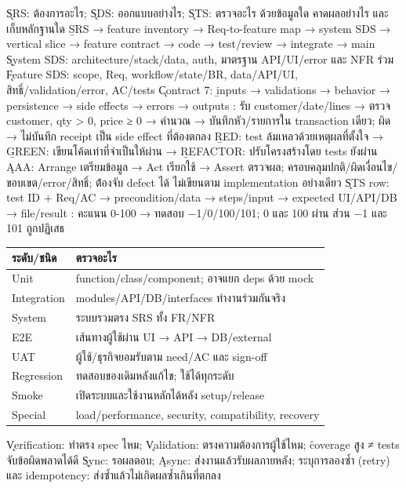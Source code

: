 \k{SRS}: ต้องการอะไร; \k{SDS}: ออกแบบอย่างไร; \k{STS}: ตรวจอะไร ด้วยข้อมูลใด คาดผลอย่างไร และเก็บหลักฐานใด
\b{SRS → feature inventory → Req-to-feature map → system SDS → vertical slice → feature contract → code → test/review → integrate → main}
\k{System SDS}: architecture/stack/data, auth, มาตรฐาน API/UI/error และ NFR ร่วม
\k{Feature SDS}: scope, Req, workflow/state/BR, data/API/UI, สิทธิ์/validation/error, AC/tests
\k{Contract 7}: \b{inputs → validations → behavior → persistence → side effects → errors → outputs}
: รับ customer/date/lines → ตรวจ customer, qty > 0, price ≥ 0 → คำนวณ → บันทึกหัว/รายการใน transaction เดียว; ผิด → ไม่บันทึก \extra receipt เป็น side effect ที่ต้องตกลง
\b{RED}: test ล้มเหลวด้วยเหตุผลที่ตั้งใจ → \b{GREEN}: เขียนโค้ดเท่าที่จำเป็นให้ผ่าน → \b{REFACTOR}: ปรับโครงสร้างโดย tests ยังผ่าน
\k{AAA}: Arrange เตรียมข้อมูล → Act เรียกใช้ → Assert ตรวจผล; ครอบคลุมปกติ/ผิดเงื่อนไข/ขอบเขต/error/สิทธิ์; \r{ต้องจับ defect ได้ ไม่เขียนตาม implementation อย่างเดียว}
\k{STS row}: test ID + Req/AC → precondition/data → steps/input → expected UI/API/DB → file/result
\extra {}: คะแนน 0-100 → ทดสอบ −1/0/100/101; 0 และ 100 ผ่าน ส่วน −1 และ 101 ถูกปฏิเสธ
{\smalltable\begin{tabularx}{\linewidth}{|p{11mm}|Y|}\hline
{}ระดับ/ชนิด & ตรวจอะไร\\\hline
Unit & function/class/component; อาจแยก deps ด้วย mock\\\hline
Integration & modules/API/DB/interfaces ทำงานร่วมกันจริง\\\hline
System & ระบบรวมตรง SRS ทั้ง FR/NFR\\\hline
E2E & เส้นทางผู้ใช้ผ่าน UI → API → DB/external\\\hline
UAT & ผู้ใช้/ธุรกิจยอมรับตาม need/AC และ sign-off\\\hline
Regression & ทดสอบของเดิมหลังแก้ไข; ใช้ได้ทุกระดับ\\\hline
Smoke & เปิดระบบและใช้งานหลักได้หลัง setup/release\\\hline
Special & load/performance, security, compatibility, recovery\\\hline
\end{tabularx}}
\k{Verification}: ทำตรง spec ไหม; \k{Validation}: ตรงความต้องการผู้ใช้ไหม; \r{coverage สูง ≠ tests จับข้อผิดพลาดได้ดี}
\k{Sync}: รอผลตอบ; \k{Async}: ส่งงานแล้วรับผลภายหลัง; ระบุการลองซ้ำ (retry) และ idempotency: ส่งซ้ำแล้วไม่เกิดผลซ้ำเกินที่ตกลง
